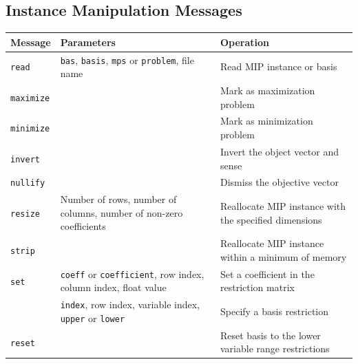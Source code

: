 \documentclass[a4paper,11pt,twoside]{book}
\begin{document}
\subsection{Instance Manipulation Messages}
\medskip
\begin{center}
\begin{tabular}{|p{3cm}|p{9cm}|p{11.5cm}|}
\hline
{\bf Message}       & {\bf Parameters} & {\bf Operation} \\
\hline
\hline
\verb/read/         & \verb/bas/, \verb/basis/, \verb/mps/
                      or \verb/problem/, file name
                    & Read MIP instance or basis \\
\hline
\verb/maximize/     & & Mark as maximization problem \\
\hline
\verb/minimize/     & & Mark as minimization problem \\
\hline
\verb/invert/       & & Invert the object vector and sense \\
\hline
\verb/nullify/      & & Dismiss the objective vector \\
\hline
\verb/resize/       & Number of rows, number of
                      columns, number of non-zero coefficients
                    & Reallocate MIP instance with
                      the specified dimensions \\
\hline
\verb/strip/        & & Reallocate MIP instance within
                        a minimum of memory \\
\hline
\verb/set/          & \verb/coeff/ or \verb/coefficient/, row
                      index, column index, float value
                    & Set a coefficient in the restriction matrix \\
\hline
                    & \verb/index/, row index, variable
                      index, \verb/upper/ or \verb/lower/
                    & Specify a basis restriction \\
\hline
\verb/reset/        & & Reset basis to the lower
                        variable range restrictions \\
\hline
\end{tabular}
\end{center}


\vfill
\end{document}
